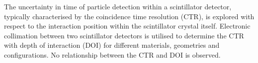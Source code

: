 The uncertainty in time of particle detection within a scintillator detector, typically characterised by the coincidence time resolution (CTR), is explored with respect to the interaction position within the scintillator crystal itself. Electronic collimation between two scintillator detectors is utilised to determine the CTR with depth of interaction (DOI) for different materials, geometries and configurations. No relationship between the CTR and DOI is observed.